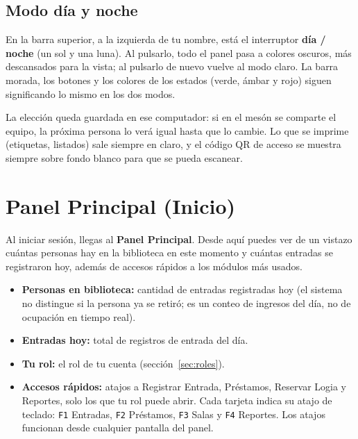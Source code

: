 \documentclass[11pt,a4paper]{report}
\begin{document}

\section{Modo día y noche}

En la barra superior, a la izquierda de tu nombre, está el interruptor
\textbf{día / noche} (un sol y una luna). Al pulsarlo, todo el panel pasa
a colores oscuros, más descansados para la vista; al pulsarlo de nuevo
vuelve al modo claro. La barra morada, los botones y los colores de los
estados (verde, ámbar y rojo) siguen significando lo mismo en los dos
modos.


La elección queda guardada en ese computador: si en el mesón se comparte
el equipo, la próxima persona lo verá igual hasta que lo cambie. Lo que se
imprime (etiquetas, listados) sale siempre en claro, y el código QR de
acceso se muestra siempre sobre fondo blanco para que se pueda escanear.

\chapter{Panel Principal (Inicio)}

Al iniciar sesión, llegas al \textbf{Panel Principal}. Desde aquí puedes
ver de un vistazo cuántas personas hay en la biblioteca en este momento y
cuántas entradas se registraron hoy, además de accesos rápidos a los
módulos más usados.


\begin{itemize}
  \item \textbf{Personas en biblioteca:} cantidad de entradas registradas
  hoy (el sistema no distingue si la persona ya se retiró; es un conteo
  de ingresos del día, no de ocupación en tiempo real).
  \item \textbf{Entradas hoy:} total de registros de entrada del día.
  \item \textbf{Tu rol:} el rol de tu cuenta (sección~\ref{sec:roles}).
  \item \textbf{Accesos rápidos:} atajos a Registrar Entrada, Préstamos,
  Reservar Logia y Reportes, solo los que tu rol puede abrir. Cada
  tarjeta indica su atajo de teclado: \texttt{F1} Entradas, \texttt{F2}
  Préstamos, \texttt{F3} Salas y \texttt{F4} Reportes. Los atajos
  funcionan desde cualquier pantalla del panel.
\end{itemize}
\end{document}
